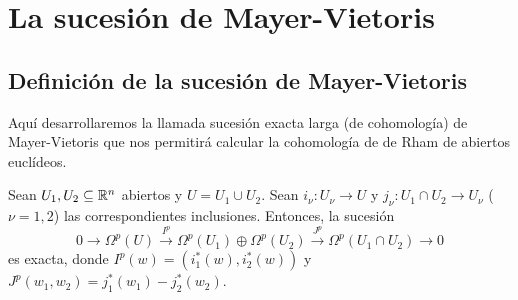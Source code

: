 \documentclass[CV.tex]{subfiles}
\begin{document}

\chapter{La sucesión de Mayer-Vietoris}

\section{Definición de la sucesión de Mayer-Vietoris}
Aquí desarrollaremos la llamada sucesión exacta larga (de cohomología) de Mayer-Vietoris que nos permitirá calcular la cohomología de de Rham de abiertos euclídeos.

\begin{teorema}
Sean $U_1,U_2\subseteq\mathbb{R}^n$ abiertos y $U=U_1\cup U_2$. Sean $i_{\nu}:U_{\nu}\to U$ y $j_{\nu}:U_1\cap U_2\to U_{\nu}$ ($\nu=1,2$) las correspondientes inclusiones. Entonces, la sucesión
\[
0\to \Omega^p(U)\overset{I^p}{\to}\Omega^p(U_1)\oplus\Omega^p(U_2)\overset{J^p}{\to}\Omega^p(U_1\cap U_2)\to 0
\]
es exacta, donde $I^p(w)=(i_1^*(w), i_2^*(w))$ y $J^p(w_1,w_2)=j_1^*(w_1)-j_2^*(w_2)$.
\end{teorema}
\end{document}
